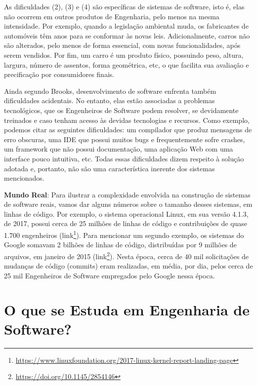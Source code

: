 \documentclass[
  11pt,
  twoside]{book}
\DeclareRobustCommand{\href}[2]{#2\footnote{\url{#1}}}
\newenvironment{esmbox}{\centering \vspace{1.5ex} \begin{tcolorbox}[breakable, colback=backcolor, width=4.9in]}{\end{tcolorbox} \vspace{1.5ex}}
\begin{document}
As dificuldades (2), (3) e (4) são específicas de sistemas de software,
isto é, elas não ocorrem em outros produtos de Engenharia, pelo menos na
mesma intensidade. Por exemplo, quando a legislação ambiental muda, os
fabricantes de automóveis têm anos para se conformar às novas leis.
Adicionalmente, carros não são alterados, pelo menos de forma essencial,
com novas funcionalidades, após serem vendidos. Por fim, um carro é um
produto físico, possuindo peso, altura, largura, número de assentos,
forma geométrica, etc, o que facilita sua avaliação e precificação por
consumidores finais.

Ainda segundo Brooks, desenvolvimento de software enfrenta também
dificuldades acidentais. No entanto, elas estão associadas a problemas
tecnológicos, que os Engenheiros de Software podem resolver, se
devidamente treinados e caso tenham acesso às devidas tecnologias e
recursos. Como exemplo, podemos citar as seguintes dificuldades: um
compilador que produz mensagens de erro obscuras, uma IDE que possui
muitos bugs e frequentemente sofre crashes, um framework que não possui
documentação, uma aplicação Web com uma interface pouco intuitiva, etc.
Todas essas dificuldades dizem respeito à solução adotada e, portanto,
não são uma característica inerente dos sistemas mencionados.

 

\begin{esmbox}

\textbf{Mundo Real}: Para ilustrar a complexidade envolvida na
construção de sistemas de software reais, vamos dar alguns números sobre
o tamanho desses sistemas, em linhas de código. Por exemplo, o sistema
operacional Linux, em sua versão 4.1.3, de 2017, possui cerca de 25
milhões de linhas de código e contribuições de quase 1.700 engenheiros
(\href{https://www.linuxfoundation.org/2017-linux-kernel-report-landing-page}{link}).
Para mencionar um segundo exemplo, os sistemas do Google somavam 2
bilhões de linhas de código, distribuídas por 9 milhões de arquivos, em
janeiro de 2015 (\href{https://doi.org/10.1145/2854146}{link}). Nesta
época, cerca de 40 mil solicitações de mudanças de código (commits) eram
realizadas, em média, por dia, pelos cerca de 25 mil Engenheiros de
Software empregados pelo Google nessa época.

\end{esmbox}

\hypertarget{o-que-se-estuda-em-engenharia-de-software}{%
\section{O que se Estuda em Engenharia de
Software?}\label{o-que-se-estuda-em-engenharia-de-software}}
\end{document}
